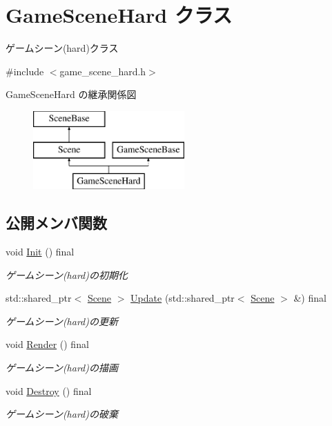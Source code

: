 \hypertarget{class_game_scene_hard}{}\section{Game\+Scene\+Hard クラス}
\label{class_game_scene_hard}


ゲームシーン(hard)クラス  




{\ttfamily \#include $<$game\+\_\+scene\+\_\+hard.\+h$>$}

Game\+Scene\+Hard の継承関係図\begin{figure}[H]
\begin{center}
\leavevmode
\includegraphics[height=3.000000cm]{class_game_scene_hard}
\end{center}
\end{figure}
\subsection*{公開メンバ関数}
\begin{DoxyCompactItemize}
\item 
void \mbox{\hyperlink{class_game_scene_hard_affc2e6a09c13a625730eeb0e742cb22a}{Init}} () final
\begin{DoxyCompactList}\small\item\em ゲームシーン(hard)の初期化 \end{DoxyCompactList}\item 
std\+::shared\+\_\+ptr$<$ \mbox{\hyperlink{class_scene}{Scene}} $>$ \mbox{\hyperlink{class_game_scene_hard_ac132a0e281a7d4e6b71deb6e5bcfdb9d}{Update}} (std\+::shared\+\_\+ptr$<$ \mbox{\hyperlink{class_scene}{Scene}} $>$ \&) final
\begin{DoxyCompactList}\small\item\em ゲームシーン(hard)の更新 \end{DoxyCompactList}\item 
void \mbox{\hyperlink{class_game_scene_hard_ab4d10e5fc6e39746f80ef967d6a02eae}{Render}} () final
\begin{DoxyCompactList}\small\item\em ゲームシーン(hard)の描画 \end{DoxyCompactList}\item 
void \mbox{\hyperlink{class_game_scene_hard_a7a2ddc79c737ede4d1125d352c5756c1}{Destroy}} () final
\begin{DoxyCompactList}\small\item\em ゲームシーン(hard)の破棄 \end{DoxyCompactList}\end{DoxyCompactItemize}


